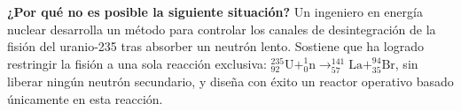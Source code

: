 \item \textbf{¿Por qué no es posible la siguiente situación?}
Un ingeniero en energía nuclear desarrolla un método para controlar los canales de desintegración de la fisión del uranio-235 tras absorber un neutrón lento. Sostiene que ha logrado restringir la fisión a una sola reacción exclusiva: $^{235}_{92}\text{U} + ^{1}_{0}\text{n} \to ^{141}_{57}\text{La} + ^{94}_{35}\text{Br}$, sin liberar ningún neutrón secundario, y diseña con éxito un reactor operativo basado únicamente en esta reacción.
